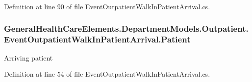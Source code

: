 Definition at line 90 of file Event\+Outpatient\+Walk\+In\+Patient\+Arrival.\+cs.

\subsubsection[{\texorpdfstring{Patient}{Patient}}]{ General\+Health\+Care\+Elements.\+Department\+Models.\+Outpatient.\+Event\+Outpatient\+Walk\+In\+Patient\+Arrival.\+Patient\hspace{0.3cm}{\ttfamily [get]}}\hypertarget{class_general_health_care_elements_1_1_department_models_1_1_outpatient_1_1_event_outpatient_walk_in_patient_arrival_a7500251a7629b12661856ebefabc8290}{}\label{class_general_health_care_elements_1_1_department_models_1_1_outpatient_1_1_event_outpatient_walk_in_patient_arrival_a7500251a7629b12661856ebefabc8290}


Arriving patient 



Definition at line 54 of file Event\+Outpatient\+Walk\+In\+Patient\+Arrival.\+cs.

